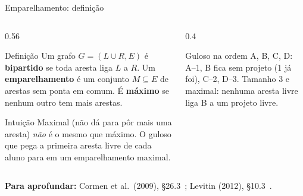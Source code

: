 \documentclass[aspectratio=169,xcolor=table]{beamer}
\newcommand{\arestasbip}{A/p1, A/p2, B/p1, C/p2, C/p3, D/p3, D/p4}
\newcommand{\nosbip}{%
  \node[vert] (A) at (0,1.2)  {A};  \node[vert] (B) at (0,0.4)  {B};
  \node[vert] (C) at (0,-0.4) {C};  \node[vert] (D) at (0,-1.2) {D};
  \node[vert] (p1) at (2,1.2)  {1}; \node[vert] (p2) at (2,0.4)  {2};
  \node[vert] (p3) at (2,-0.4) {3}; \node[vert] (p4) at (2,-1.2) {4};
}
\newcommand{\bip}[2]{%
  \nosbip
  \foreach \u/\v in \arestasbip \draw[aresta] (\u) -- (\v);
  \def\lista{#1}\ifx\lista\empty\else
    \foreach \u/\v in {#1} \draw[emp] (\u) -- (\v);\fi
  \def\lista{#2}\ifx\lista\empty\else
    \foreach \u/\v in {#2} \draw[alt] (\u) -- (\v);\fi
}
\newcommand{\fonte}[1]{%
  \vfill
  {\tiny\color{gray!55!black}\textbf{Para aprofundar:} #1\par}%
}
\begin{document}
\begin{frame}{Emparelhamento: definição}
  \begin{columns}[c]
    \begin{column}{0.56\textwidth}
      \begin{block}{Definição}
        \small
        Um grafo $G = (L \cup R, E)$ é \textbf{bipartido} se toda aresta liga $L$ a $R$. Um
        \textbf{emparelhamento} é um conjunto $M \subseteq E$ de arestas sem ponta em comum. É
        \textbf{máximo} se nenhum outro tem mais arestas.
      \end{block}
      \begin{exampleblock}{Intuição}
        \small Maximal (não dá para pôr mais uma aresta) \emph{não} é o mesmo que máximo. O
        guloso que pega a primeira aresta livre de cada aluno para em um emparelhamento maximal.
      \end{exampleblock}
    \end{column}
    \begin{column}{0.4\textwidth}
      \begin{center}
      \end{center}
      {\scriptsize Guloso na ordem A, B, C, D: A--1, B fica sem projeto (1 já foi), C--2,
      D--3. Tamanho 3 e maximal: nenhuma aresta livre liga B a um projeto livre.\par}
    \end{column}
  \end{columns}
  \fonte{Cormen et al.\ (2009), \S 26.3~\cite{cormen2009introduction};
    Levitin (2012), \S 10.3~\cite{levitin2012introduction}.}
\end{frame}
\end{document}
